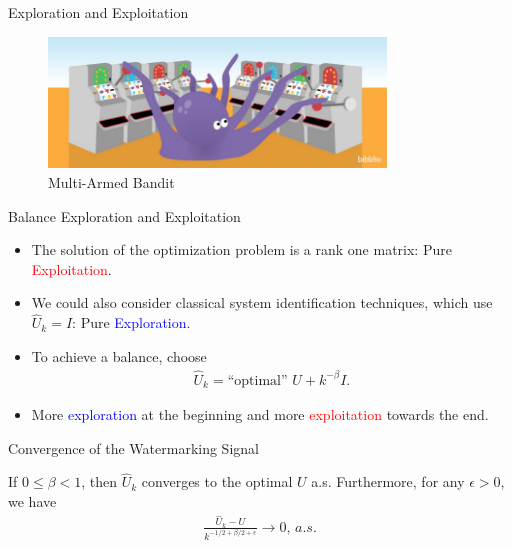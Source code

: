 \documentclass[10pt]{beamer}
\begin{document}
\begin{frame}{Exploration and Exploitation}
  \begin{figure}[ht]
    \centering
    \includegraphics[width=0.8\textwidth]{bandit.png}
    \caption{Multi-Armed Bandit}
  \end{figure}
\end{frame}

\begin{frame}{Balance Exploration and Exploitation}
  \begin{itemize}
  \item The solution of the optimization problem is a rank one matrix: Pure \textcolor{red}{Exploitation}.
  \item We could also consider classical system identification techniques, which use $\hat U_k=I$: Pure \textcolor{blue}{Exploration}.
  \item To achieve a balance, choose
    \begin{align*}
      \hat U_k = \text{``optimal'' } U + k^{-\beta} I.
    \end{align*}
  \item More \textcolor{blue}{exploration} at the beginning and more \textcolor{red}{exploitation} towards the end.
  \end{itemize}
\end{frame}

\begin{frame}{Convergence of the Watermarking Signal}
  \begin{theorem}
    If $0 \leq \beta < 1$, then $\hat U_k$ converges to the optimal $U$ a.s. Furthermore, for any $\epsilon > 0$, we have
    \begin{align*}
      \frac{\hat U_k - U}{k^{-1/2+\beta/2+\epsilon}} \rightarrow 0,\,a.s.
    \end{align*}
  \end{theorem}
\end{frame}
\end{document}
